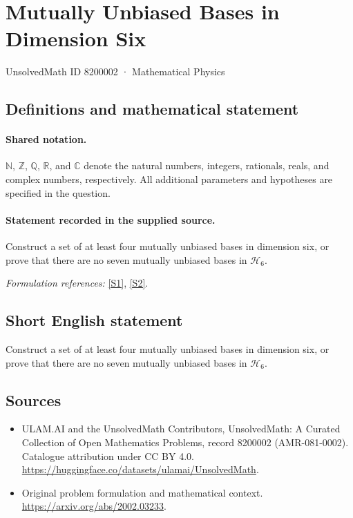 \documentclass[11pt]{article}
\newcommand{\sref}[2]{\hyperlink{source:#1:#2}{[S#2]}}
\begin{document}
\setcounter{section}{8200001}
\section{Mutually Unbiased Bases in Dimension Six}\label{8200002}
{\small UnsolvedMath ID 8200002 · Mathematical Physics}
\subsection{Definitions and mathematical statement}

\paragraph{Shared notation.}$\mathbb N$, $\mathbb Z$, $\mathbb Q$, $\mathbb R$, and $\mathbb C$ denote the natural numbers, integers, rationals, reals, and complex numbers, respectively. All additional parameters and hypotheses are specified in the question.


\paragraph{Statement recorded in the supplied source.}
Construct a set of at least four mutually unbiased bases in dimension six, or prove that there are no seven mutually unbiased bases in $\mathcal{H}_6$.
\par\smallskip\textit{Formulation references:} \sref{8200002}{1}, \sref{8200002}{2}.
\subsection{Short English statement}
Construct a set of at least four mutually unbiased bases in dimension six, or prove that there are no seven mutually unbiased bases in $\mathcal{H}_6$.
\subsection{Sources}
\begin{itemize}
\item[\hypertarget{source:8200002:1}{S1}] ULAM.AI and the UnsolvedMath Contributors, UnsolvedMath: A Curated Collection of Open Mathematics Problems, record 8200002 (AMR-081-0002). Catalogue attribution under CC BY 4.0.
\url{https://huggingface.co/datasets/ulamai/UnsolvedMath}.
\item[\hypertarget{source:8200002:2}{S2}] Original problem formulation and mathematical context.
\url{https://arxiv.org/abs/2002.03233}.
\end{itemize}
\label{end:8200002}
\end{document}
